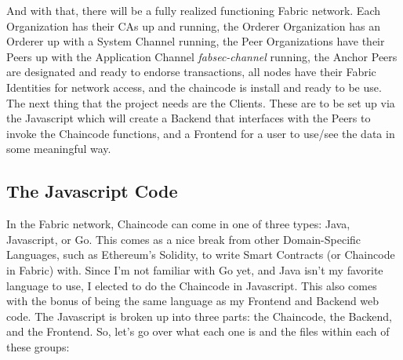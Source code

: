 		\hspace{10mm}And with that, there will be a fully realized functioning Fabric network. Each Organization has their CAs up and running, the Orderer Organization has an Orderer up with a System Channel running, the Peer Organizations have their Peers up with the Application Channel \textit{fabsec-channel} running, the Anchor Peers are designated and ready to endorse transactions, all nodes have their Fabric Identities for network access, and the chaincode is install and ready to be use. The next thing that the project needs are the Clients. These are to be set up via the Javascript which will create a Backend that interfaces with the Peers to invoke the Chaincode functions, and a Frontend for a user to use/see the data in some meaningful way.
					
	\subsection{The Javascript Code}
		\hspace{10mm} In the Fabric network, Chaincode can come in one of three types: Java, Javascript, or Go. This comes as a nice break from other Domain-Specific Languages, such as Ethereum's Solidity, to write Smart Contracts (or Chaincode in Fabric) with. Since I'm not familiar with Go yet, and Java isn't my favorite language to use, I elected to do the Chaincode in Javascript. This also comes with the bonus of being the same language as my Frontend and Backend web code. The Javascript is broken up into three parts: the Chaincode, the Backend, and the Frontend. So, let's go over what each one is and the files within each of these groups:
		

